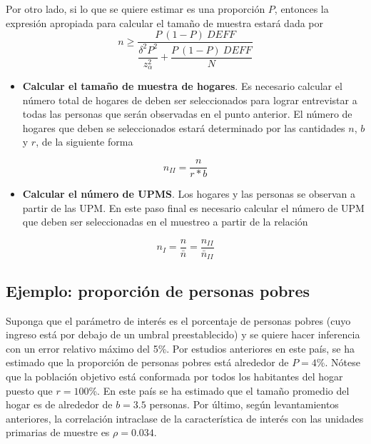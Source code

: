\documentclass[
  12pt,
  spanish,
]{book}
\providecommand{\tightlist}{%
  \setlength{\itemsep}{0pt}\setlength{\parskip}{0pt}}
\begin{document}
Por otro lado, si lo que se quiere estimar es una proporción \(P\), entonces la expresión apropiada para calcular el tamaño de muestra estará dada por
\[
n \geq \dfrac{P\ (1-P)\ DEFF}{\dfrac{\delta^2P^2}{z_{\alpha}^2 }+\dfrac{P\ (1-P) \ DEFF}{N}}
\]

\begin{itemize}
\tightlist
\item
  \textbf{Calcular el tamaño de muestra de hogares}. Es necesario calcular el número total de hogares de deben ser seleccionados para lograr entrevistar a todas las personas que serán observadas en el punto anterior. El número de hogares que deben se seleccionados estará determinado por las cantidades \(n\), \(b\) y \(r\), de la siguiente forma
\end{itemize}

\[
n_{II} = \dfrac{n}{r * b}
\]

\begin{itemize}
\tightlist
\item
  \textbf{Calcular el número de UPMS}. Los hogares y las personas se observan a partir de las UPM. En este paso final es necesario calcular el número de UPM que deben ser seleccionadas en el muestreo a partir de la relación
\end{itemize}

\[
n_{I} = \frac{n}{\bar{n}} 
= \frac{n_{II}}{\bar{n}_{II}}
\]

\hypertarget{ejemplo-proporciuxf3n-de-personas-pobres}{%
\subsection*{Ejemplo: proporción de personas pobres}\label{ejemplo-proporciuxf3n-de-personas-pobres}}

Suponga que el parámetro de interés es el porcentaje de personas pobres (cuyo ingreso está por debajo de un umbral preestablecido) y se quiere hacer inferencia con un error relativo máximo del 5\%. Por estudios anteriores en este país, se ha estimado que la proporción de personas pobres está alrededor de \(P = 4\)\%. Nótese que la población objetivo está conformada por todos los habitantes del hogar puesto que \(r = 100\)\%. En este país se ha estimado que el tamaño promedio del hogar es de alrededor de \(b = 3.5\) personas. Por último, según levantamientos anteriores, la correlación intraclase de la característica de interés con las unidades primarias de muestre es \(\rho = 0.034\).
\end{document}
